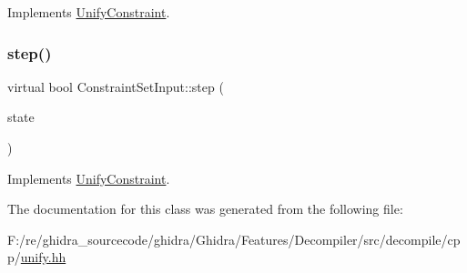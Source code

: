Implements \mbox{\hyperlink{class_unify_constraint_a774f6a611a96384766cb8e8d8f5ff41f}{Unify\+Constraint}}.

\mbox{\label{class_constraint_set_input_afe2320ca9a36a19fec3bcfaa7130c0ca}} 
\subsubsection{\texorpdfstring{step()}{step()}}
{\footnotesize\ttfamily virtual bool Constraint\+Set\+Input\+::step (\begin{DoxyParamCaption}\item[{\mbox{\hyperlink{class_unify_state}{Unify\+State}} \&}]{state }\end{DoxyParamCaption})\hspace{0.3cm}{\ttfamily [virtual]}}



Implements \mbox{\hyperlink{class_unify_constraint_ad9ab4ad91037f96bf803735d414d212d}{Unify\+Constraint}}.



The documentation for this class was generated from the following file\+:\begin{DoxyCompactItemize}
\item 
F\+:/re/ghidra\+\_\+sourcecode/ghidra/\+Ghidra/\+Features/\+Decompiler/src/decompile/cpp/\mbox{\hyperlink{unify_8hh}{unify.\+hh}}\end{DoxyCompactItemize}
